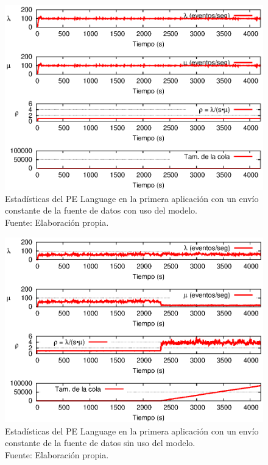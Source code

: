 \begin{figure}[!ht]
    \centering
    \captionsetup{justification=centering}
    \includegraphics[scale=1.1]{images/exp/app1/uniform/cm/statusLanguagePE.eps}
    \caption[Estadísticas del PE Language en la primera aplicación con un envío constante de la fuente de datos con uso del modelo.]{Estadísticas del PE Language en la primera aplicación con un envío constante de la fuente de datos con uso del modelo.\\Fuente: Elaboración propia.}
    \label{fig:app1-uniform-statusLanguagePE-cm}
\end{figure}

\begin{figure}[!ht]
    \centering
    \captionsetup{justification=centering}
    \includegraphics[scale=1]{images/exp/app1/uniform/sm/statusLanguagePE.eps}
    \caption[Estadísticas del PE Language en la primera aplicación con un envío constante de la fuente de datos sin uso del modelo.]{Estadísticas del PE Language en la primera aplicación con un envío constante de la fuente de datos sin uso del modelo.\\Fuente: Elaboración propia.}
    \label{fig:app1-uniform-statusLanguagePE-sm}
\end{figure}

